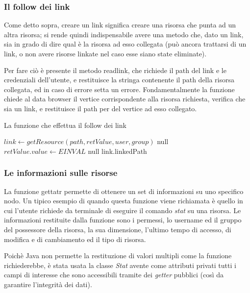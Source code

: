 \newpage

\subsubsection{Il follow dei link}
Come detto sopra, creare un link significa creare una risorsa che punta ad un altra risorsa; si rende quindi indispensabile avere una metodo che, dato un link, sia in grado di dire qual è la risorsa ad esso collegata (può ancora trattarsi di un link, o non avere risorse linkate nel caso esse siano state eliminate).

Per fare ciò è presente il metodo readlink, che richiede il path del link e le credenziali dell'utente, e restituisce la stringa contenente il path della risorsa collegata, ed in caso di errore setta un errore. Fondamentalmente la funzione chiede al data browser il vertice corrispondente alla risorsa richiesta, verifica che sia un link, e restituisce il path per del vertice ad esso collegato.

\begin{algorithm}
\begin{algorithmic}[5]
\caption{La funzione che effettua il follow dei link}
	\State $link \gets getResource(path, retValue, user, group)$
		\State \Return null
	\EndIf
		\State $retValue.value \gets EINVAL$
		\State \Return null
	\EndIf
	\Return link.linkedPath
\EndFunction
\end{algorithmic}
\end{algorithm}

\subsubsection{Le informazioni sulle risorse}
La funzione gettatr permette di ottenere un set di informazioni su uno specifico nodo. Un tipico esempio di quando questa funzione viene richiamata è quello in cui l'utente richiede da terminale di eseguire il comando \emph{stat} su una risorsa. Le informazioni restituite dalla funzione sono i permessi, lo username ed il gruppo del possessore della risorsa, la sua dimensione, l'ultimo tempo di accesso, di modifica e di cambiamento ed il tipo di risorsa.

Poichè Java non permette la restituzione di valori multipli come la funzione richiederebbe, è stata usata la classe \emph{Stat} avente come attributi privati tutti i campi di interesse che sono accessibili tramite dei \emph{getter} pubblici (così da garantire l'integrità dei dati).

